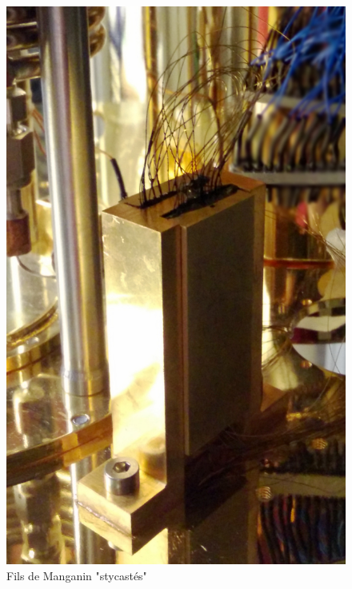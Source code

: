 \documentclass[10pt,a9paper,handout]{beamer} \usepackage[utf8]{inputenc} \usepackage[francais]{babel} \usepackage[T1]{fontenc}
\begin{document}
\begin{frame}
\begin{columns}
\begin{column}{0.3\textwidth}
\begin{figure}
\begin{center}
        \includegraphics[width=\textwidth]{Images/Thermalisation/DC}
        \caption{Fils de Manganin "stycastés"}
    \end{center}
\end{figure}
\end{column}
\end{columns}
\end{frame}
\end{document}
